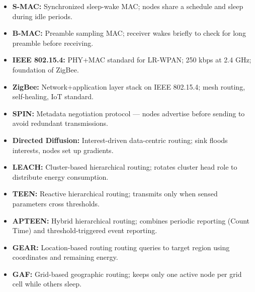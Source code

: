 \documentclass[12pt,a4paper]{article}
\begin{document}
\begin{tcolorbox}[defbox, title={\textbf{One-Line Definitions}}]
\begin{itemize}[leftmargin=*, itemsep=3pt]
  \item \textbf{S-MAC:} Synchronized sleep-wake MAC; nodes share a schedule and sleep during idle periods.
  \item \textbf{B-MAC:} Preamble sampling MAC; receiver wakes briefly to check for long preamble before receiving.
  \item \textbf{IEEE 802.15.4:} PHY+MAC standard for LR-WPAN; 250 kbps at 2.4 GHz; foundation of ZigBee.
  \item \textbf{ZigBee:} Network+application layer stack on IEEE 802.15.4; mesh routing, self-healing, IoT standard.
  \item \textbf{SPIN:} Metadata negotiation protocol --- nodes advertise before sending to avoid redundant transmissions.
  \item \textbf{Directed Diffusion:} Interest-driven data-centric routing; sink floods interests, nodes set up gradients.
  \item \textbf{LEACH:} Cluster-based hierarchical routing; rotates cluster head role to distribute energy consumption.
  \item \textbf{TEEN:} Reactive hierarchical routing; transmits only when sensed parameters cross thresholds.
  \item \textbf{APTEEN:} Hybrid hierarchical routing; combines periodic reporting (Count Time) and threshold-triggered event reporting.
  \item \textbf{GEAR:} Location-based routing routing queries to target region using coordinates and remaining energy.
  \item \textbf{GAF:} Grid-based geographic routing; keeps only one active node per grid cell while others sleep.
\end{itemize}
\end{tcolorbox}
\end{document}
